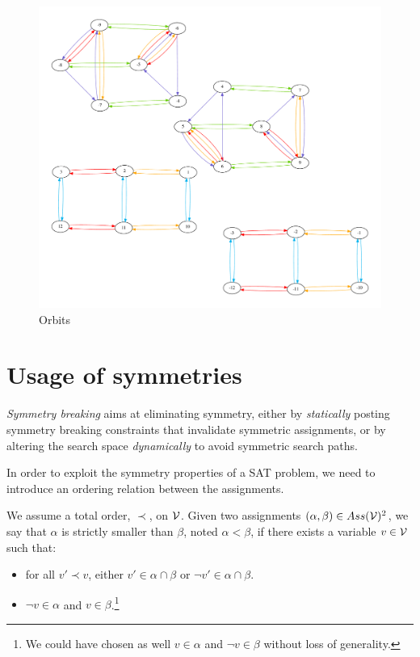  \begin{figure}[h]
 	\centering
 		\includegraphics[width=\textwidth]{cnfs/orbits}
 	\caption{Orbits}
 	\label{fig:orbits}
 \end{figure}



\section{Usage of symmetries}

\emph{Symmetry breaking} aims at eliminating symmetry, either
by \emph{statically} posting symmetry breaking constraints that invalidate symmetric
assignments, or by altering the search space \emph{dynamically} to avoid symmetric search paths.


In order to exploit the symmetry properties of a SAT problem, we need to
introduce an ordering relation between the assignments.

\begin{definition}
	\label{def:assignment_ordering}
	We assume a total order, $\prec$, on $\mathcal{V}$.  Given two assignments $(\alpha,\beta) \in Ass(\mathcal{V})^2 $, 
	we say that $\alpha$ is strictly smaller than $\beta$, noted $\alpha < \beta$, if there exists a variable $v \in \mathcal{V}$
	such that:
	\begin{itemize}
		\item for all $v' \prec v$, either $v' \in \alpha \cap \beta$ or $\neg v' \in \alpha \cap
		\beta$.
		\item $\neg v \in \alpha$ and $v \in \beta$.\footnote{We could have chosen as well $v \in \alpha$ and $\neg v \in \beta$ without loss of generality.}
	\end{itemize}
\end{definition}

